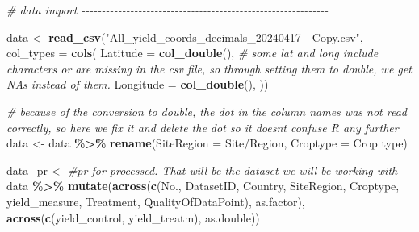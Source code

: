 \documentclass[
]{article}
\newenvironment{Shaded}{\begin{snugshade}}{\end{snugshade}}
\newcommand{\AttributeTok}[1]{\textcolor[rgb]{0.13,0.29,0.53}{#1}}
\newcommand{\CommentTok}[1]{\textcolor[rgb]{0.56,0.35,0.01}{\textit{#1}}}
\newcommand{\FunctionTok}[1]{\textcolor[rgb]{0.13,0.29,0.53}{\textbf{#1}}}
\newcommand{\NormalTok}[1]{#1}
\newcommand{\OtherTok}[1]{\textcolor[rgb]{0.56,0.35,0.01}{#1}}
\newcommand{\SpecialCharTok}[1]{\textcolor[rgb]{0.81,0.36,0.00}{\textbf{#1}}}
\newcommand{\StringTok}[1]{\textcolor[rgb]{0.31,0.60,0.02}{#1}}
\begin{document}
\begin{Shaded}
\begin{Highlighting}[]
\CommentTok{\# data import {-}{-}{-}{-}{-}{-}{-}{-}{-}{-}{-}{-}{-}{-}{-}{-}{-}{-}{-}{-}{-}{-}{-}{-}{-}{-}{-}{-}{-}{-}{-}{-}{-}{-}{-}{-}{-}{-}{-}{-}{-}{-}{-}{-}{-}{-}{-}{-}{-}{-}{-}{-}{-}{-}{-}{-}{-}{-}{-}{-}{-}}

\NormalTok{data }\OtherTok{\textless{}{-}} \FunctionTok{read\_csv}\NormalTok{(}\StringTok{"All\_yield\_coords\_decimals\_20240417 {-} Copy.csv"}\NormalTok{,}
                 \AttributeTok{col\_types =} \FunctionTok{cols}\NormalTok{(}
                   \AttributeTok{Latitude =} \FunctionTok{col\_double}\NormalTok{(),   }\CommentTok{\# some lat and long include characters or are missing in the csv file, so through setting them to double, we get NAs instead of them. }
                   \AttributeTok{Longitude =} \FunctionTok{col\_double}\NormalTok{(),}
\NormalTok{                 )) }

\CommentTok{\# because of the conversion to double, the dot in the column names was not read correctly, so here we fix it and delete the dot so it doesnt confuse R any further }
\NormalTok{data }\OtherTok{\textless{}{-}}\NormalTok{ data }\SpecialCharTok{\%\textgreater{}\%}
    \FunctionTok{rename}\NormalTok{(}\StringTok{\textasciigrave{}}\AttributeTok{SiteRegion}\StringTok{\textasciigrave{}} \OtherTok{=} \StringTok{\textasciigrave{}}\AttributeTok{Site/Region}\StringTok{\textasciigrave{}}\NormalTok{,}
         \StringTok{\textasciigrave{}}\AttributeTok{Croptype}\StringTok{\textasciigrave{}} \OtherTok{=} \StringTok{\textasciigrave{}}\AttributeTok{Crop type}\StringTok{\textasciigrave{}}\NormalTok{)}

\NormalTok{data\_pr }\OtherTok{\textless{}{-}} \CommentTok{\#pr for processed. That will be the dataset we will be working with }
\NormalTok{    data }\SpecialCharTok{\%\textgreater{}\%}
    \FunctionTok{mutate}\NormalTok{(}\FunctionTok{across}\NormalTok{(}\FunctionTok{c}\NormalTok{(No., DatasetID, Country, SiteRegion, Croptype, yield\_measure, Treatment, QualityOfDataPoint), as.factor),}
         \FunctionTok{across}\NormalTok{(}\FunctionTok{c}\NormalTok{(yield\_control, yield\_treatm), as.double))}
\end{Highlighting}
\end{Shaded}
\end{document}
